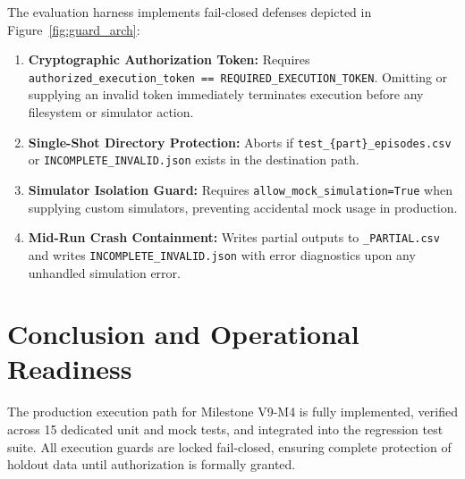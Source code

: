 \documentclass[10pt,a4paper]{article}
\begin{document}
The evaluation harness implements fail-closed defenses depicted in Figure~\ref{fig:guard_arch}:
\begin{enumerate}
    \item \textbf{Cryptographic Authorization Token:} Requires \texttt{authorized\_execution\_token == REQUIRED\_EXECUTION\_TOKEN}. Omitting or supplying an invalid token immediately terminates execution before any filesystem or simulator action.
    \item \textbf{Single-Shot Directory Protection:} Aborts if \texttt{test\_\{part\}\_episodes.csv} or \texttt{INCOMPLETE\_INVALID.json} exists in the destination path.
    \item \textbf{Simulator Isolation Guard:} Requires \texttt{allow\_mock\_simulation=True} when supplying custom simulators, preventing accidental mock usage in production.
    \item \textbf{Mid-Run Crash Containment:} Writes partial outputs to \texttt{\_PARTIAL.csv} and writes \texttt{INCOMPLETE\_INVALID.json} with error diagnostics upon any unhandled simulation error.
\end{enumerate}

\section{Conclusion and Operational Readiness}
The production execution path for Milestone V9-M4 is fully implemented, verified across 15 dedicated unit and mock tests, and integrated into the regression test suite. All execution guards are locked fail-closed, ensuring complete protection of holdout data until authorization is formally granted.
\end{document}
